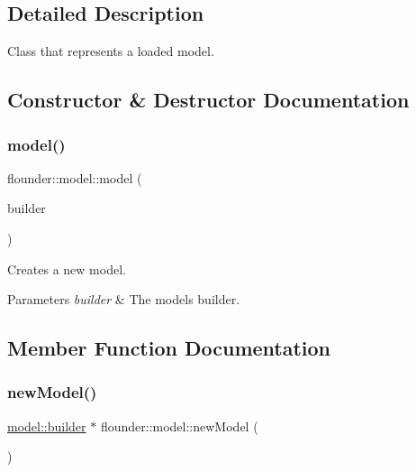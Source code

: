 \subsection{Detailed Description}
Class that represents a loaded model. 



\subsection{Constructor \& Destructor Documentation}
\mbox{\label{classflounder_1_1model_a6a27604e53fce127b6f6da4fb4d74972}} 
\subsubsection{\texorpdfstring{model()}{model()}}
{\footnotesize\ttfamily flounder\+::model\+::model (\begin{DoxyParamCaption}\item[{\hyperlink{classflounder_1_1model_1_1builder}{builder} $\ast$}]{builder }\end{DoxyParamCaption})\hspace{0.3cm}{\ttfamily [protected]}}



Creates a new model. 


\begin{DoxyParams}{Parameters}
{\em builder} & The models builder. \\
\hline
\end{DoxyParams}


\subsection{Member Function Documentation}
\mbox{\label{classflounder_1_1model_a55bec80a4092dbe35c319c49d1d50ed8}} 
\subsubsection{\texorpdfstring{new\+Model()}{newModel()}}
{\footnotesize\ttfamily \hyperlink{classflounder_1_1model_1_1builder}{model\+::builder} $\ast$ flounder\+::model\+::new\+Model (\begin{DoxyParamCaption}{ }\end{DoxyParamCaption})\hspace{0.3cm}{\ttfamily [static]}}




